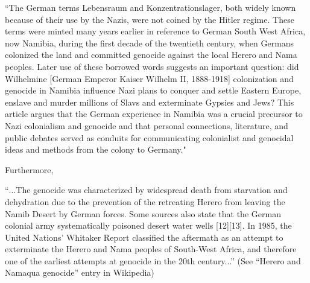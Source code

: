 \begin{myquote}
``The German terms Lebensraum and Konzentrationslager, both widely known because of their use by the Nazis, were not coined by the Hitler regime. These terms were minted many years earlier in reference to German South West Africa, now Namibia, during the first decade of the twentieth century, when Germans colonized the land and committed genocide against the local Herero and Nama peoples. Later use of these borrowed words suggests an important question: did Wilhelmine [German Emperor Kaiser Wilhelm II, 1888-1918] colonization and genocide in Namibia  influence Nazi plans to conquer and settle Eastern Europe, enslave and murder millions of Slavs and exterminate Gypsies and Jews? This article argues that the German experience in Namibia was a crucial precursor to Nazi colonialism and genocide and that personal connections, literature, and public debates served as conduits for communicating colonialist and genocidal ideas and methods from the colony to Germany."
\end{myquote}

Furthermore, 
\begin{myquote}
“$\ldots$The genocide was characterized by widespread death from starvation and dehydration due to the prevention of the retreating Herero from leaving the Namib Desert by German forces. Some sources also state that the German colonial army systematically poisoned desert water wells [12][13]. In 1985, the United Nations' Whitaker Report classified the aftermath as an attempt to exterminate the Herero and Nama peoples of South-West Africa, and therefore one of the earliest attempts at genocide in the 20th century...” \hfill(See “Herero and Namaqua genocide” entry in Wikipedia)
\end{myquote}

